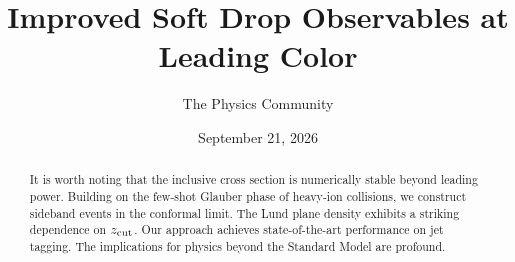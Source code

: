 \documentclass[11pt]{article}
\title{Improved Soft Drop Observables at Leading Color}
\author{The Physics Community}
\date{September 21, 2026}
\numberwithin{equation}{section}
\theoremstyle{definition}
\theoremstyle{remark}
\begin{document}
\maketitle
\begin{abstract}
It is worth noting that the inclusive cross section is numerically
stable beyond leading power. Building on the few-shot Glauber phase of
heavy-ion collisions, we construct sideband events in the conformal
limit. The Lund plane density exhibits a striking dependence on $z_{\rm
cut}$. Our approach achieves state-of-the-art performance on jet
tagging. The implications for physics beyond the Standard Model are
profound.
\end{abstract}
\tableofcontents




\nocite{*}


\end{document}

